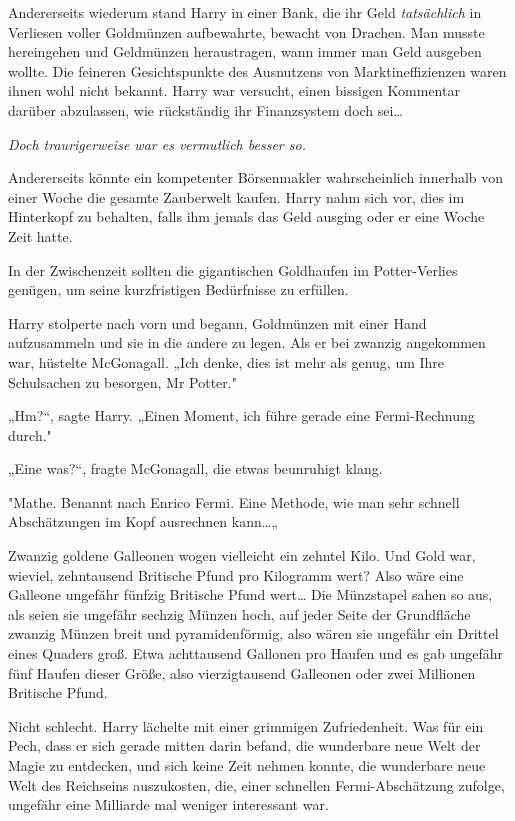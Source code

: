 {Andererseits wiederum stand Harry in einer Bank, die ihr Geld \emph{tatsächlich} in Verliesen voller Goldmünzen aufbewahrte, bewacht von Drachen. Man musste hereingehen und Geldmünzen heraustragen, wann immer man Geld ausgeben wollte. Die feineren Gesichtspunkte des Ausnutzens von Marktineffizienzen waren ihnen wohl nicht bekannt. Harry war versucht, einen bissigen Kommentar darüber abzulassen, wie rückständig ihr Finanzsystem doch sei…

\emph{Doch traurigerweise war es vermutlich besser so.}

Andererseits könnte ein kompetenter Börsenmakler wahrscheinlich innerhalb von einer Woche die gesamte Zauberwelt kaufen. Harry nahm sich vor, dies im Hinterkopf zu behalten, falls ihm jemals das Geld ausging oder er eine Woche Zeit hatte.

In der Zwischenzeit sollten die gigantischen Goldhaufen im Potter-Verlies genügen, um seine kurzfristigen Bedürfnisse zu erfüllen.

Harry stolperte nach vorn und begann, Goldmünzen mit einer Hand aufzusammeln und sie in die andere zu legen. Als er bei zwanzig angekommen war, hüstelte McGonagall. „Ich denke, dies ist mehr als genug, um Ihre Schulsachen zu besorgen, Mr Potter."

„Hm?“, sagte Harry. „Einen Moment, ich führe gerade eine Fermi-Rechnung durch."

„Eine was?“, fragte McGonagall, die etwas beunruhigt klang.

"Mathe. Benannt nach Enrico Fermi. Eine Methode, wie man sehr schnell Abschätzungen im Kopf ausrechnen kann…„

Zwanzig goldene Galleonen wogen vielleicht ein zehntel Kilo. Und Gold war, wieviel, zehntausend Britische Pfund pro Kilogramm wert? Also wäre eine Galleone ungefähr fünfzig Britische Pfund wert… Die Münzstapel sahen so aus, als seien sie ungefähr sechzig Münzen hoch, auf jeder Seite der Grundfläche zwanzig Münzen breit und pyramidenförmig, also wären sie ungefähr ein Drittel eines Quaders groß. Etwa achttausend Gallonen pro Haufen und es gab ungefähr fünf Haufen dieser Größe, also vierzigtausend Galleonen oder zwei Millionen Britische Pfund.

Nicht schlecht. Harry lächelte mit einer grimmigen Zufriedenheit. Was für ein Pech, dass er sich gerade mitten darin befand, die wunderbare neue Welt der Magie zu entdecken, und sich keine Zeit nehmen konnte, die wunderbare neue Welt des Reichseins auszukosten, die, einer schnellen Fermi-Abschätzung zufolge, ungefähr eine Milliarde mal weniger interessant war.

}
